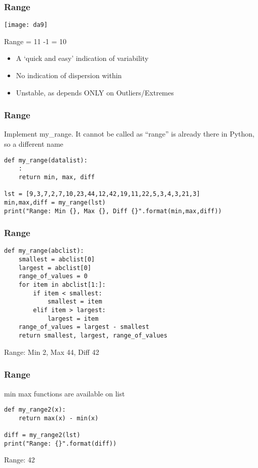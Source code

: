 \begin{frame}[fragile]\frametitle{Range}	
\begin{center}
\texttt{[image: da9]}
\end{center}
Range = 11 -1 = 10

\begin{itemize}
\item A `quick and easy' indication of variability
\item No indication of dispersion within
\item Unstable, as depends ONLY on Outliers/Extremes
\end{itemize}
\end{frame}

\begin{frame}[fragile]\frametitle{Range}
Implement my\_range. It cannot be called as ``range'' is already there in Python, so a different name
\begin{lstlisting}
def my_range(datalist):
	:
	return min, max, diff

lst = [9,3,7,2,7,10,23,44,12,42,19,11,22,5,3,4,3,21,3]
min,max,diff = my_range(lst)
print("Range: Min {}, Max {}, Diff {}".format(min,max,diff))
\end{lstlisting}
\end{frame}

\begin{frame}[fragile]\frametitle{Range}
\begin{lstlisting}
def my_range(abclist):
    smallest = abclist[0]
    largest = abclist[0]
    range_of_values = 0
    for item in abclist[1:]:
        if item < smallest:
            smallest = item
        elif item > largest:
            largest = item
    range_of_values = largest - smallest
    return smallest, largest, range_of_values
\end{lstlisting}
Range: Min 2, Max 44, Diff 42
\end{frame}

\begin{frame}[fragile]\frametitle{Range}
min max functions are available on list
\begin{lstlisting}
def my_range2(x):
	return max(x) - min(x)

diff = my_range2(lst)
print("Range: {}".format(diff))	
\end{lstlisting}
Range: 42
\end{frame}



